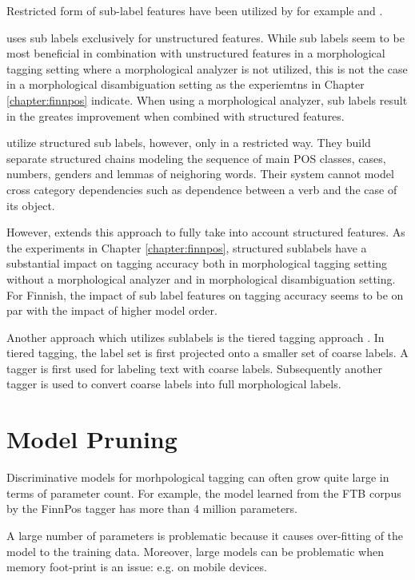 Restricted form of sub-label features have been utilized by for
example \cite{Muller2013} and \cite{Smith2005}.
 
\cite{Muller2013} uses sub labels exclusively for unstructured
features. While sub labels seem to be most beneficial in combination
with unstructured features in a morphological tagging setting where a
morphological analyzer is not utilized, this is not the case in a
morphological disambiguation setting as the experiemtns in Chapter
\ref{chapter:finnpos} indicate. When using a morphological analyzer,
sub labels result in the greates improvement when combined with
structured features.

\cite{Smith2015} utilize structured sub labels, however, only in a
restricted way. They build separate structured chains modeling the
sequence of main POS classes, cases, numbers, genders and lemmas of
neighoring words. Their system cannot model cross category
dependencies such as dependence between a verb and the case of its
object.

However, \cite{Silfvererg2014} extends this approach to fully take
into account structured features. As the experiments in Chapter
\ref{chapter:finnpos}, structured sublabels have a substantial impact
on tagging accuracy both in morphological tagging setting without a
morphological analyzer and in morphological disambiguation
setting. For Finnish, the impact of sub label features on tagging
accuracy seems to be on par with the impact of higher model order.

Another approach which utilizes sublabels is the tiered tagging
approach \citep{Tufis1999,Ceausu2006}. In tiered tagging, the label
set is first projected onto a smaller set of coarse labels. A tagger
is first used for labeling text with coarse labels. Subsequently
another tagger is used to convert coarse labels into full
morphological labels.

\section{Model Pruning}\label{sec:pruning}

Discriminative models for morhpological tagging can often grow quite
large in terms of parameter count. For example, the model learned from
the FTB corpus by the FinnPos tagger has more than 4 million
parameters.

A large number of parameters is problematic because it causes
over-fitting of the model to the training data. Moreover, large models
can be problematic when memory foot-print is an issue: e.g. on mobile
devices.

